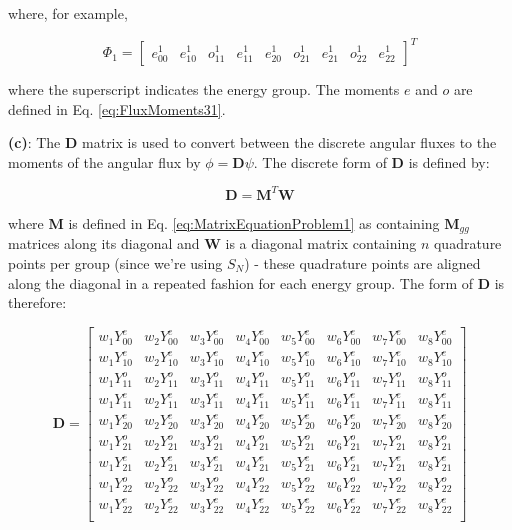 \documentclass[10pt]{article}
\begin{document}
where, for example,

\begin{equation}
\Phi_1=\begin{bmatrix}
e_{00}^1 & e_{10}^1 & o_{11}^1 & e_{11}^1 & e_{20}^1 & o_{21}^1 & e_{21}^1 & o_{22}^1 & e_{22}^1
\end{bmatrix}^T
\end{equation}

where the superscript indicates the energy group. The moments \(e\) and \(o\) are defined in Eq. \eqref{eq:FluxMoments31}.\newline

\textbf{(c)}: The \textbf{D} matrix is used to convert between the discrete angular fluxes to the moments of the angular flux by \(\phi=\textbf{D}\psi\). The discrete form of \textbf{D} is defined by:

\begin{equation}
\textbf{D}=\textbf{M}^T\textbf{W}
\end{equation}

where \textbf{M} is defined in Eq. \eqref{eq:MatrixEquationProblem1} as containing \(\textbf{M}_{gg}\) matrices along its diagonal and \textbf{W} is a diagonal matrix containing \(n\) quadrature points per group (since we're using \(S_N\)) - these quadrature points are aligned along the diagonal in a repeated fashion for each energy group. The form of \textbf{D} is therefore:

\begin{equation}
\textbf{D}=\begin{bmatrix}
w_1Y_{00}^e & w_2Y_{00}^e & w_3Y_{00}^e & w_4Y_{00}^e & w_5Y_{00}^e & w_6Y_{00}^e & w_7Y_{00}^e & w_8Y_{00}^e\\
w_1Y_{10}^e & w_2Y_{10}^e & w_3Y_{10}^e & w_4Y_{10}^e & w_5Y_{10}^e & w_6Y_{10}^e & w_7Y_{10}^e & w_8Y_{10}^e\\
w_1Y_{11}^o & w_2Y_{11}^o & w_3Y_{11}^o & w_4Y_{11}^o & w_5Y_{11}^o & w_6Y_{11}^o & w_7Y_{11}^o & w_8Y_{11}^o\\
w_1Y_{11}^e & w_2Y_{11}^e & w_3Y_{11}^e & w_4Y_{11}^e & w_5Y_{11}^e & w_6Y_{11}^e & w_7Y_{11}^e & w_8Y_{11}^e\\
w_1Y_{20}^e & w_2Y_{20}^e & w_3Y_{20}^e & w_4Y_{20}^e & w_5Y_{20}^e & w_6Y_{20}^e & w_7Y_{20}^e & w_8Y_{20}^e\\
w_1Y_{21}^o & w_2Y_{21}^o & w_3Y_{21}^o & w_4Y_{21}^o & w_5Y_{21}^o & w_6Y_{21}^o & w_7Y_{21}^o & w_8Y_{21}^o\\
w_1Y_{21}^e & w_2Y_{21}^e & w_3Y_{21}^e & w_4Y_{21}^e & w_5Y_{21}^e & w_6Y_{21}^e & w_7Y_{21}^e & w_8Y_{21}^e\\
w_1Y_{22}^o & w_2Y_{22}^o & w_3Y_{22}^o & w_4Y_{22}^o & w_5Y_{22}^o & w_6Y_{22}^o & w_7Y_{22}^o & w_8Y_{22}^o\\
w_1Y_{22}^e & w_2Y_{22}^e & w_3Y_{22}^e & w_4Y_{22}^e & w_5Y_{22}^e & w_6Y_{22}^e & w_7Y_{22}^e & w_8Y_{22}^e\\
\end{bmatrix}
\end{equation}
\end{document}
